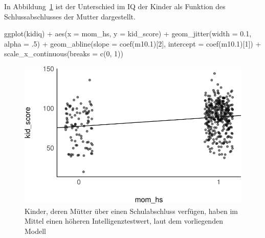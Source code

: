 \documentclass[
  a4paper,
  DIV=11]{scrreprt}
\newenvironment{Shaded}{\begin{snugshade}}{\end{snugshade}}
\newcommand{\AttributeTok}[1]{\textcolor[rgb]{0.40,0.45,0.13}{#1}}
\newcommand{\DecValTok}[1]{\textcolor[rgb]{0.68,0.00,0.00}{#1}}
\newcommand{\FloatTok}[1]{\textcolor[rgb]{0.68,0.00,0.00}{#1}}
\newcommand{\FunctionTok}[1]{\textcolor[rgb]{0.28,0.35,0.67}{#1}}
\newcommand{\NormalTok}[1]{\textcolor[rgb]{0.00,0.23,0.31}{#1}}
\newcommand{\SpecialCharTok}[1]{\textcolor[rgb]{0.37,0.37,0.37}{#1}}
\theoremstyle{definition}
\theoremstyle{remark}
\begin{document}
In Abbildung~\ref{fig-momkid} ist der Unterschied im IQ der Kinder als
Funktion des Schlussabschlusses der Mutter dargestellt.

\begin{Shaded}
\begin{Highlighting}[]
\FunctionTok{ggplot}\NormalTok{(kidiq) }\SpecialCharTok{+}
  \FunctionTok{aes}\NormalTok{(}\AttributeTok{x =}\NormalTok{ mom\_hs, }\AttributeTok{y =}\NormalTok{ kid\_score) }\SpecialCharTok{+}
  \FunctionTok{geom\_jitter}\NormalTok{(}\AttributeTok{width =} \FloatTok{0.1}\NormalTok{, }\AttributeTok{alpha =}\NormalTok{ .}\DecValTok{5}\NormalTok{) }\SpecialCharTok{+}
  \FunctionTok{geom\_abline}\NormalTok{(}\AttributeTok{slope =} \FunctionTok{coef}\NormalTok{(m10}\FloatTok{.1}\NormalTok{)[}\DecValTok{2}\NormalTok{],}
              \AttributeTok{intercept =} \FunctionTok{coef}\NormalTok{(m10}\FloatTok{.1}\NormalTok{)[}\DecValTok{1}\NormalTok{])  }\SpecialCharTok{+}
  \FunctionTok{scale\_x\_continuous}\NormalTok{(}\AttributeTok{breaks =} \FunctionTok{c}\NormalTok{(}\DecValTok{0}\NormalTok{, }\DecValTok{1}\NormalTok{))}
\end{Highlighting}
\end{Shaded}

\begin{figure}[H]

{\centering \includegraphics{./metrische-AV_files/figure-pdf/fig-momkid-1.pdf}

}

\caption{\label{fig-momkid}Kinder, deren Mütter über einen
Schulabschluss verfügen, haben im Mittel einen höheren
Intelligenztestwert, laut dem vorliegenden Modell}

\end{figure}
\end{document}
